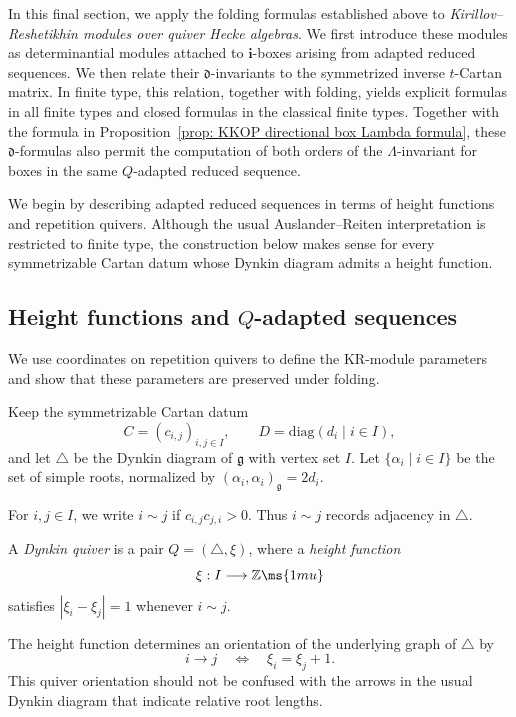 \documentclass[12pt, leqno]{amsart}
\numberwithin{equation}{section}
\theoremstyle{plain}
\theoremstyle{definition}
\newcommand{\g}{\mathfrak{g}}
\newcommand{\Z}{\mathbb{Z}\ms{1mu}}
\newcommand{\de}{\mathfrak{d}}
\newcommand{\Dynkin}{\triangle}
\newcommand{\bfi}{\mathbf{i}}
\newcommand{\diag}{\mathrm{diag}}
\begin{document}
In this final section, we apply the folding formulas established
above to \emph{Kirillov--Reshetikhin modules over quiver Hecke algebras}.
We first introduce these modules as determinantial modules attached
to \(\bfi\)-boxes arising from adapted reduced sequences.
We then relate their \(\de\)-invariants to the symmetrized inverse
\(t\)-Cartan matrix.
In finite type, this relation, together with folding, yields
explicit formulas in all finite types and closed formulas in the
classical finite types.
Together with the formula in
Proposition~\ref{prop: KKOP directional box Lambda formula}, these
\(\de\)-formulas also permit the computation of both orders of the
\(\Lambda\)-invariant for boxes in the same \(Q\)-adapted reduced
sequence.

We begin by describing adapted reduced sequences in terms of height
functions and repetition quivers.
Although the usual Auslander--Reiten interpretation is restricted
to finite type, the construction below makes sense for every
symmetrizable Cartan datum whose Dynkin diagram admits a height
function.

\subsection{Height functions and
\texorpdfstring{\(Q\)}{Q}-adapted sequences}
\label{subsec: height functions and Q-adapted sequences}

We use coordinates on repetition quivers to define the
KR-module parameters and show that these parameters are
preserved under folding.

Keep the symmetrizable Cartan datum
\[
C=(c_{i,j})_{i,j\in I}, \qquad D=\diag(d_i\mid i\in I),
\]
and let \(\Dynkin\) be the Dynkin diagram of $\g$ with vertex set \(I\). 
Let $\{\alpha_i\mid i\in I\}$
be the set of simple roots, normalized by
$(\alpha_i,\alpha_i)_\g=2d_i$.

For \(i,j\in I\), we write $i\sim j$
if $c_{i,j}c_{j,i}>0$. Thus \(i\sim j\) records adjacency in \(\Dynkin\).

A \emph{Dynkin quiver} is a pair $Q=(\Dynkin,\xi)$,
where a \emph{height function}
\[
\xi:I\longrightarrow\Z
\]
satisfies $|\xi_i-\xi_j|=1$ whenever $i\sim j$.

The height function determines an orientation of the underlying
graph of \(\Dynkin\) by
\[
i\longrightarrow j \quad\Longleftrightarrow\quad \xi_i=\xi_j+1.
\]
This quiver orientation should not be confused with the arrows in
the usual Dynkin diagram that indicate relative root lengths.
\end{document}
